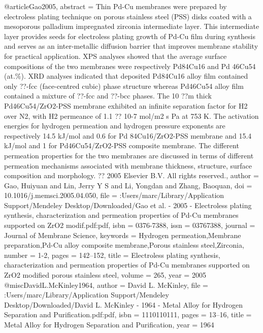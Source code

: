 @article{Gao2005,
abstract = {Thin Pd-Cu membranes were prepared by electroless plating technique on porous stainless steel (PSS) disks coated with a mesoporous palladium impregnated zirconia intermediate layer. This intermediate layer provides seeds for electroless plating growth of Pd-Cu film during synthesis and serves as an inter-metallic diffusion barrier that improves membrane stability for practical application. XPS analyses showed that the average surface compositions of the two membranes were respectively Pd84Cu16 and Pd 46Cu54 (at.{\%}). XRD analyses indicated that deposited Pd84Cu16 alloy film contained only ??-fcc (face-centred cubic) phase structure whereas Pd46Cu54 alloy film contained a mixture of ??-fcc and ??-bcc phases. The 10 ??m thick Pd46Cu54/ZrO2-PSS membrane exhibited an infinite separation factor for H2 over N2, with H2 permeance of 1.1 ?? 10-7 mol/m2 s Pa at 753 K. The activation energies for hydrogen permeation and hydrogen pressure exponents are respectively 14.5 kJ/mol and 0.6 for Pd 84Cu16/ZrO2-PSS membrane and 15.4 kJ/mol and 1 for Pd46Cu54/ZrO2-PSS composite membrane. The different permeation properties for the two membranes are discussed in terms of different permeation mechanisms associated with membrane thickness, structure, surface composition and morphology. ?? 2005 Elsevier B.V. All rights reserved.},
author = {Gao, Huiyuan and Lin, Jerry Y S and Li, Yongdan and Zhang, Baoquan},
doi = {10.1016/j.memsci.2005.04.050},
file = {:Users/marc/Library/Application Support/Mendeley Desktop/Downloaded/Gao et al. - 2005 - Electroless plating synthesis, characterization and permeation properties of Pd-Cu membranes supported on ZrO2 modif.pdf:pdf},
isbn = {0376-7388},
issn = {03767388},
journal = {Journal of Membrane Science},
keywords = {Hydrogen permeation,Membrane preparation,Pd-Cu alloy composite membrane,Porous stainless steel,Zirconia},
number = {1-2},
pages = {142--152},
title = {{Electroless plating synthesis, characterization and permeation properties of Pd-Cu membranes supported on ZrO2 modified porous stainless steel}},
volume = {265},
year = {2005}
}
@misc{DavidL.McKinley1964,
author = {{David L. McKinley}},
file = {:Users/marc/Library/Application Support/Mendeley Desktop/Downloaded/David L. McKinley - 1964 - Metal Alloy for Hydrogen Separation and Purification.pdf:pdf},
isbn = {1110110111},
pages = {13--16},
title = {{Metal Alloy for Hydrogen Separation and Purification}},
year = {1964}
}
